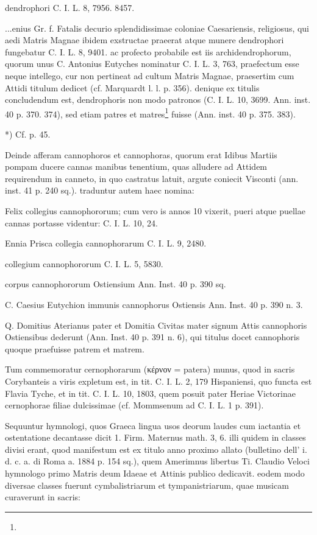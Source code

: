 \documentclass[a4paper, 11pt, oneside, polutonikogreek, german]{article}
\begin{document}
dendrophori C. I. L. 8, 7956. 8457.

...enius Gr. f. Fatalis decurio splendidissimae coloniae Caesariensis, religiosus, qui aedi Matris Magnae ibidem exstructae praeerat atque munere dendrophori fungebatur C. I. L. 8, 9401. ac profecto probabile est iis archidendrophorum, quorum unus C. Antonius Eutyches nominatur C. I. L. 3, 763, praefectum esse neque intellego, cur non pertineat ad cultum Matris Magnae, praesertim cum Attidi titulum dedicet (cf. Marquardt l. l. p. 356). denique ex titulis concludendum est, dendrophoris non modo patronos (C. I. L. 10, 3699. Ann. inst. 40 p. 370. 374), sed etiam patres et matres\footnote{} fuisse (Ann. inst. 40 p. 375. 383).

*) Cf. p. 45.

Deinde afferam cannophoros et cannophoras, quorum erat Idibus Martiis pompam ducere cannas manibus tenentium, quas alludere ad Attidem requirendum in canneto, in quo castratus latuit, argute coniecit Visconti (ann. inst. 41 p. 240 sq.). traduntur autem haec nomina:

Felix collegius cannophororum; cum vero is annos 10 vixerit, pueri atque puellae cannas portasse videntur: C. I. L. 10, 24.

Ennia Prisca collegia cannophorarum C. I. L. 9, 2480.

collegium cannophororum C. I. L. 5, 5830.

corpus cannophororum Ostiensium Ann. Inst. 40 p. 390 sq.

C. Caesius Eutychion immunis cannophorus Ostiensis Ann. Inst. 40 p. 390 n. 3.

Q. Domitius Aterianus pater et Domitia Civitas mater signum Attis cannophoris Ostiensibus dederunt (Ann. Inst. 40 p. 391 n. 6), qui titulus docet cannophoris quoque praefuisse patrem et matrem.

Tum commemoratur cernophorarum (κέρνον = patera) munus, quod in sacris Corybanteis a viris expletum est, in tit. C. I. L. 2, 179 Hispaniensi, quo functa est Flavia Tyche, et in tit. C. I. L. 10, 1803, quem posuit pater Heriae Victorinae cernophorae filiae dulcissimae (cf. Mommsenum ad C. I. L. 1 p. 391).

Sequuntur hymnologi, quos Graeca lingua usos deorum laudes cum iactantia et ostentatione decantasse dicit 1. Firm. Maternus math. 3, 6. illi quidem in classes divisi erant, quod manifestum est ex titulo anno proximo allato (bulletino dell' i. d. c. a. di Roma a. 1884 p. 154 sq.), quem Amerimnus libertus Ti. Claudio Veloci hymnologo primo Matris deum Idaeae et Attinis publico dedicavit. eodem modo diversae classes fuerunt cymbalistriarum et tympanistriarum, quae musicam curaverunt in sacris:
\end{document}
